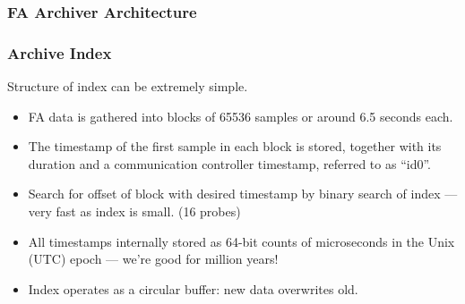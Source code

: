 \documentclass{beamer}
\begin{document}
\begin{frame}\frametitle{FA Archiver Architecture}

\end{frame}


\begin{frame}\frametitle{Archive Index}
Structure of index can be extremely simple.
\begin{itemize}
\item FA data is gathered into blocks of 65536 samples or around 6.5 seconds
each.
\item The timestamp of the first sample in each block is stored, together with
its duration and a communication controller timestamp, referred to as ``id0''.
\item Search for offset of block with desired timestamp by binary search of
index --- very fast as index is small.  {\scriptsize(16 probes)}
\item All timestamps internally stored as 64-bit counts of microseconds in the
Unix (UTC) epoch --- we're good for \textonehalf{} million years!
\item Index operates as a circular buffer: new data overwrites old.
\end{itemize}
\end{frame}
\end{document}
